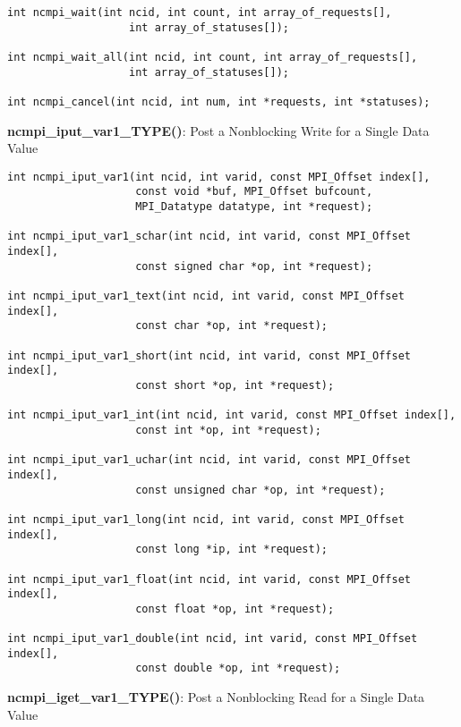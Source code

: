 \begin{verbatim}
int ncmpi_wait(int ncid, int count, int array_of_requests[],
                   int array_of_statuses[]);

int ncmpi_wait_all(int ncid, int count, int array_of_requests[],
                   int array_of_statuses[]);

int ncmpi_cancel(int ncid, int num, int *requests, int *statuses);
\end{verbatim}


{\bf ncmpi\_iput\_var1\_TYPE()}: Post a Nonblocking Write for a Single Data Value

\begin{verbatim}
int ncmpi_iput_var1(int ncid, int varid, const MPI_Offset index[],
                    const void *buf, MPI_Offset bufcount,
                    MPI_Datatype datatype, int *request);

int ncmpi_iput_var1_schar(int ncid, int varid, const MPI_Offset index[],
                    const signed char *op, int *request);

int ncmpi_iput_var1_text(int ncid, int varid, const MPI_Offset index[],
                    const char *op, int *request);

int ncmpi_iput_var1_short(int ncid, int varid, const MPI_Offset index[],
                    const short *op, int *request);

int ncmpi_iput_var1_int(int ncid, int varid, const MPI_Offset index[],
                    const int *op, int *request);

int ncmpi_iput_var1_uchar(int ncid, int varid, const MPI_Offset index[],
                    const unsigned char *op, int *request);

int ncmpi_iput_var1_long(int ncid, int varid, const MPI_Offset index[],
                    const long *ip, int *request);

int ncmpi_iput_var1_float(int ncid, int varid, const MPI_Offset index[],
                    const float *op, int *request);

int ncmpi_iput_var1_double(int ncid, int varid, const MPI_Offset index[],
                    const double *op, int *request);
\end{verbatim}


{\bf ncmpi\_iget\_var1\_TYPE()}: Post a Nonblocking Read for a Single Data Value

